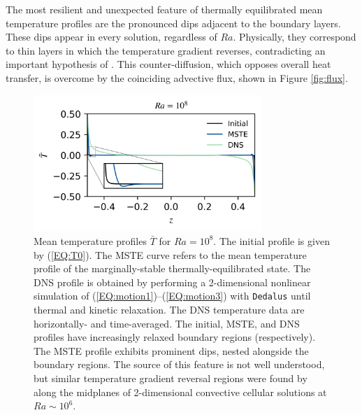 \documentclass[reprint,amsmath,amssymb,aps]{revtex4-1}
\begin{document}
The most resilient and unexpected feature of thermally equilibrated mean temperature profiles are the pronounced dips adjacent to the boundary layers. 
These dips appear in every solution, regardless of $Ra$. 
Physically, they correspond to thin layers in which the temperature gradient reverses, contradicting an important hypothesis of \cite{Malkus_1954}. 
This counter-diffusion, which opposes overall heat transfer, is overcome by the coinciding advective flux, shown in Figure \ref{fig:flux}.  
\begin{figure}
    \centering
    \includegraphics[width=3.4in]{T_profs_na.png}
    \caption{Mean temperature profiles $\bar{T}$ for $Ra = 10^8$. 
    The initial profile is given by (\ref{EQ:T0}). 
    The MSTE curve refers to the mean temperature profile of the marginally-stable thermally-equilibrated state. 
    The DNS profile is obtained by performing a 2-dimensional nonlinear simulation of (\ref{EQ:motion1})--(\ref{EQ:motion3}) with \texttt{Dedalus} until thermal and kinetic relaxation. 
    The DNS temperature data are horizontally- and time-averaged. 
    The initial, MSTE, and DNS profiles have increasingly relaxed boundary regions (respectively). 
    The MSTE profile exhibits prominent dips, nested alongside the boundary regions. 
    The source of this feature is not well understood, but similar temperature gradient reversal regions were found by \cite{chini_cells} along the midplanes of 2-dimensional convective cellular solutions at $Ra \sim 10^6$.}
    \label{fig:T0_profiles}
\end{figure}
\end{document}
